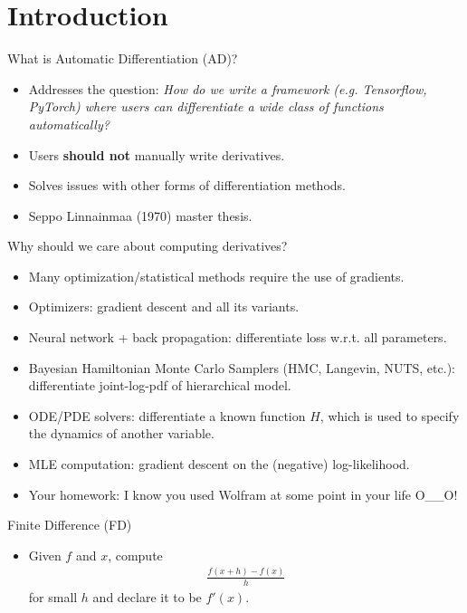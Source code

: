 \section{Introduction}
\frame{\tableofcontents[currentsection]}

\begin{frame}{What is Automatic Differentiation (AD)?}
\begin{itemize}
    \item Addresses the question: 
    \emph{How do we write a framework (e.g. Tensorflow, PyTorch)
    where users can differentiate a wide class of functions automatically?}
    \item Users \textbf{should not} manually write derivatives.
    \item Solves issues with other forms of differentiation methods.
    \item Seppo Linnainmaa (1970) master thesis.
\end{itemize}  
\end{frame}

\begin{frame}{Why should we care about computing derivatives?}
\begin{itemize}
    \item<1-> Many optimization/statistical methods require the use of gradients.
    \item Optimizers: gradient descent and all its variants.
    \item Neural network + back propagation: differentiate loss w.r.t. all parameters.
    \item Bayesian Hamiltonian Monte Carlo Samplers (HMC, Langevin, NUTS, etc.):
    differentiate joint-log-pdf of hierarchical model.
    \item ODE/PDE solvers: differentiate a known function $H$, which is used to specify the dynamics of another variable.
    \item MLE computation: gradient descent on the (negative) log-likelihood.
    \item<2-> Your homework: I know you used Wolfram at some point in your life O\_\_O!
\end{itemize}  
\end{frame}

\begin{frame}{Finite Difference (FD)}
\begin{itemize}
    \item Given $f$ and $x$, compute 
    \begin{align*}
        \frac{f(x+h) - f(x)}{h}  
    \end{align*}
    for small $h$ and declare it to be $f'(x)$.
\end{itemize}
\end{frame}

